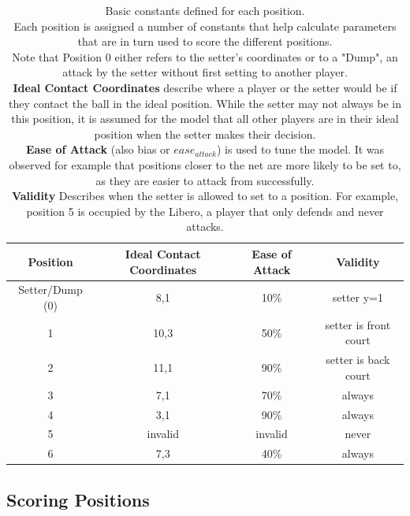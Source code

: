 \documentclass[main.tex]{subfiles}
\begin{document}
      \begin{table}[h!]
        \centering
        \caption{Basic constants defined for each position. \\
          Each position is assigned a number of constants that help calculate parameters that are in turn used to score the different positions. \\
          Note that Position 0 either refers to the setter's coordinates or to a "Dump", an attack by the setter without first setting to another player. \\
          \textbf{Ideal Contact Coordinates} describe where a player or the setter would be if they contact the ball in the ideal position. While the setter may not always be in this position, it is assumed for the model that all other players are in their ideal position when the setter makes their decision. \\
          \textbf{Ease of Attack} (also bias or \(ease_{attack}\)) is used to tune the model. It was observed for example that positions closer to the net are more likely to be set to, as they are easier to attack from successfully. \\
          \textbf{Validity} Describes when the setter is allowed to set to a position. For example, position 5 is occupied by the Libero, a player that only defends and never attacks. 
        }
        \small
        \begin{tabular}{ c | c c c }
          \hline
          Position  & Ideal Contact Coordinates & Ease of Attack & Validity \\ \hline \hline
          Setter/Dump (0) &  8,1 & 10\% & setter y=1 \\
          1 & 10,3 & 50\% & setter is front court \\
          2 & 11,1 & 90\% & setter is back court \\
          3 & 7,1 & 70\% &  always \\
          4 & 3,1 & 90\% & always \\
          5 & invalid & invalid & never\\
          6 & 7,3 & 40\% & always \\
          \hline 
        \end{tabular}
        \label{tab:positions}
        \normalsize
      \end{table}
      
    \subsection{Scoring Positions}
      
\end{document}
